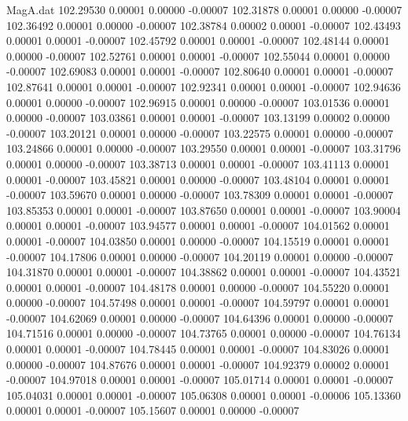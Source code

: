 \begin{filecontents}{MagA.dat}
 102.29530    0.00001    0.00000   -0.00007
 102.31878    0.00001    0.00000   -0.00007
 102.36492    0.00001    0.00000   -0.00007
 102.38784    0.00002    0.00001   -0.00007
 102.43493    0.00001    0.00001   -0.00007
 102.45792    0.00001    0.00001   -0.00007
 102.48144    0.00001    0.00000   -0.00007
 102.52761    0.00001    0.00001   -0.00007
 102.55044    0.00001    0.00000   -0.00007
 102.69083    0.00001    0.00001   -0.00007
 102.80640    0.00001    0.00001   -0.00007
 102.87641    0.00001    0.00001   -0.00007
 102.92341    0.00001    0.00001   -0.00007
 102.94636    0.00001    0.00000   -0.00007
 102.96915    0.00001    0.00000   -0.00007
 103.01536    0.00001    0.00000   -0.00007
 103.03861    0.00001    0.00001   -0.00007
 103.13199    0.00002    0.00000   -0.00007
 103.20121    0.00001    0.00000   -0.00007
 103.22575    0.00001    0.00000   -0.00007
 103.24866    0.00001    0.00000   -0.00007
 103.29550    0.00001    0.00001   -0.00007
 103.31796    0.00001    0.00000   -0.00007
 103.38713    0.00001    0.00001   -0.00007
 103.41113    0.00001    0.00001   -0.00007
 103.45821    0.00001    0.00000   -0.00007
 103.48104    0.00001    0.00001   -0.00007
 103.59670    0.00001    0.00000   -0.00007
 103.78309    0.00001    0.00001   -0.00007
 103.85353    0.00001    0.00001   -0.00007
 103.87650    0.00001    0.00001   -0.00007
 103.90004    0.00001    0.00001   -0.00007
 103.94577    0.00001    0.00001   -0.00007
 104.01562    0.00001    0.00001   -0.00007
 104.03850    0.00001    0.00000   -0.00007
 104.15519    0.00001    0.00001   -0.00007
 104.17806    0.00001    0.00000   -0.00007
 104.20119    0.00001    0.00000   -0.00007
 104.31870    0.00001    0.00001   -0.00007
 104.38862    0.00001    0.00001   -0.00007
 104.43521    0.00001    0.00001   -0.00007
 104.48178    0.00001    0.00000   -0.00007
 104.55220    0.00001    0.00000   -0.00007
 104.57498    0.00001    0.00001   -0.00007
 104.59797    0.00001    0.00001   -0.00007
 104.62069    0.00001    0.00000   -0.00007
 104.64396    0.00001    0.00000   -0.00007
 104.71516    0.00001    0.00000   -0.00007
 104.73765    0.00001    0.00000   -0.00007
 104.76134    0.00001    0.00001   -0.00007
 104.78445    0.00001    0.00001   -0.00007
 104.83026    0.00001    0.00000   -0.00007
 104.87676    0.00001    0.00001   -0.00007
 104.92379    0.00002    0.00001   -0.00007
 104.97018    0.00001    0.00001   -0.00007
 105.01714    0.00001    0.00001   -0.00007
 105.04031    0.00001    0.00001   -0.00007
 105.06308    0.00001    0.00001   -0.00006
 105.13360    0.00001    0.00001   -0.00007
 105.15607    0.00001    0.00000   -0.00007

\end{filecontents}
